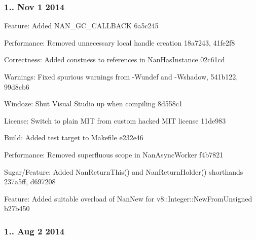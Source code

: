 \subsubsection*{1.. Nov 1 2014}


\begin{DoxyItemize}
\item Feature\+: Added N\+A\+N\+\_\+\+G\+C\+\_\+\+C\+A\+L\+L\+B\+A\+CK 6a5c245
\item Performance\+: Removed unnecessary local handle creation 18a7243, 41fe2f8
\item Correctness\+: Added constness to references in Nan\+Has\+Instance 02c61cd
\item Warnings\+: Fixed spurious warnings from -\/\+Wundef and -\/\+Wshadow, 541b122, 99d8cb6
\item Windoze\+: Shut Visual Studio up when compiling 8d558c1
\item License\+: Switch to plain M\+IT from custom hacked M\+IT license 11de983
\item Build\+: Added test target to Makefile e232e46
\item Performance\+: Removed superfluous scope in Nan\+Async\+Worker f4b7821
\item Sugar/\+Feature\+: Added Nan\+Return\+This() and Nan\+Return\+Holder() shorthands 237a5ff, d697208
\item Feature\+: Added suitable overload of Nan\+New for v8\+::\+Integer\+::\+New\+From\+Unsigned b27b450
\end{DoxyItemize}

\subsubsection*{1.. Aug 2 2014}


